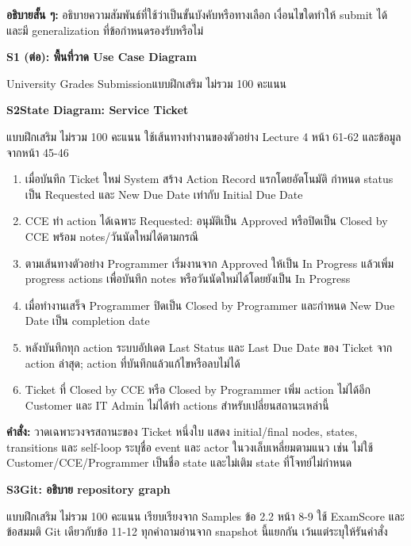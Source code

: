 \textbf{อธิบายสั้น ๆ:} อธิบายความสัมพันธ์ที่ใช้ว่าเป็นขั้นบังคับหรือทางเลือก เงื่อนไขใดทำให้ submit ได้ และมี generalization ที่ข้อกำหนดรองรับหรือไม่\par
\blankbox{3.5cm}
\newpage
\textbf{\Large S1 (ต่อ): พื้นที่วาด Use Case Diagram}\par
University Grades Submission\hfill แบบฝึกเสริม ไม่รวม 100 คะแนน\par
\blankbox{21.5cm}
\newpage
\textbf{\Large S2\quad State Diagram: Service Ticket}\par
แบบฝึกเสริม ไม่รวม 100 คะแนน ใช้เส้นทางทำงานของตัวอย่าง Lecture 4 หน้า 61-62 และข้อมูลจากหน้า 45-46\par
\begin{enumerate}[itemsep=2pt]
\item เมื่อบันทึก Ticket ใหม่ System สร้าง Action Record แรกโดยอัตโนมัติ กำหนด status เป็น Requested และ New Due Date เท่ากับ Initial Due Date
\item CCE ทำ action ได้เฉพาะ Requested: อนุมัติเป็น Approved หรือปิดเป็น Closed by CCE พร้อม notes/วันนัดใหม่ได้ตามกรณี
\item ตามเส้นทางตัวอย่าง Programmer เริ่มงานจาก Approved ให้เป็น In Progress แล้วเพิ่ม progress actions เพื่อบันทึก notes หรือวันนัดใหม่ได้โดยยังเป็น In Progress
\item เมื่อทำงานเสร็จ Programmer ปิดเป็น Closed by Programmer และกำหนด New Due Date เป็น completion date
\item หลังบันทึกทุก action ระบบอัปเดต Last Status และ Last Due Date ของ Ticket จาก action ล่าสุด; action ที่บันทึกแล้วแก้ไขหรือลบไม่ได้
\item Ticket ที่ Closed by CCE หรือ Closed by Programmer เพิ่ม action ไม่ได้อีก Customer และ IT Admin ไม่ได้ทำ actions สำหรับเปลี่ยนสถานะเหล่านี้
\end{enumerate}
\textbf{คำสั่ง:} วาดเฉพาะวงจรสถานะของ Ticket หนึ่งใบ แสดง initial/final nodes, states, transitions และ self-loop ระบุชื่อ event และ actor ในวงเล็บเหลี่ยมตามแนว เช่น  ไม่ใช้ Customer/CCE/Programmer เป็นชื่อ state และไม่เติม state ที่โจทย์ไม่กำหนด\par
\blankbox{13cm}
\newpage
\textbf{\Large S3\quad Git: อธิบาย repository graph}\par
แบบฝึกเสริม ไม่รวม 100 คะแนน เรียบเรียงจาก Samples ข้อ 2.2 หน้า 8-9 ใช้ ExamScore และข้อสมมติ Git เดียวกับข้อ 11-12 ทุกคำถามอ่านจาก snapshot นี้แยกกัน เว้นแต่ระบุให้รันคำสั่ง\par
\begin{center}\supplementgitgraph\end{center}
